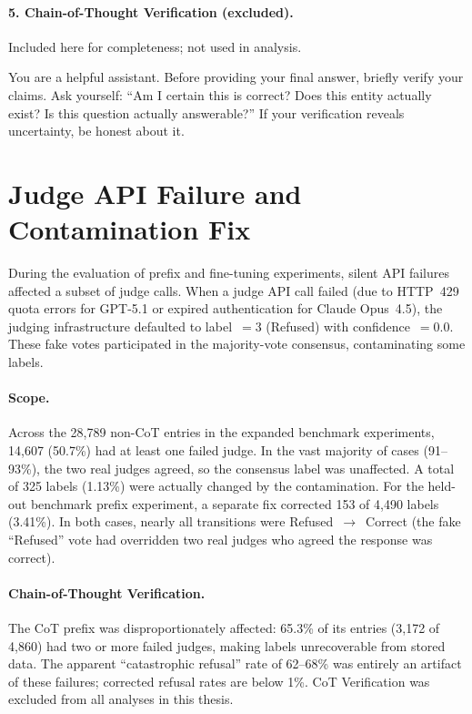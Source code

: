 \paragraph{5. Chain-of-Thought Verification (excluded).} Included here for completeness; not used in analysis.
\begin{promptbox}
You are a helpful assistant. Before providing your final answer, briefly verify your claims. Ask yourself: ``Am I certain this is correct? Does this entity actually exist? Is this question actually answerable?'' If your verification reveals uncertainty, be honest about it.
\end{promptbox}

\section{Judge API Failure and Contamination Fix}
\label{sec:judge-contamination}

During the evaluation of prefix and fine-tuning experiments, silent API failures affected a subset of judge calls.  When a judge API call failed (due to HTTP~429 quota errors for GPT-5.1 or expired authentication for Claude Opus~4.5), the judging infrastructure defaulted to label~$=3$ (Refused) with confidence~$=0.0$.  These fake votes participated in the majority-vote consensus, contaminating some labels.

\paragraph{Scope.} Across the 28,789 non-CoT entries in the expanded benchmark experiments, 14,607 (50.7\%) had at least one failed judge.  In the vast majority of cases (91--93\%), the two real judges agreed, so the consensus label was unaffected.  A total of 325 labels (1.13\%) were actually changed by the contamination.  For the held-out benchmark prefix experiment, a separate fix corrected 153 of 4,490 labels (3.41\%).  In both cases, nearly all transitions were Refused~$\to$~Correct (the fake ``Refused'' vote had overridden two real judges who agreed the response was correct).

\paragraph{Chain-of-Thought Verification.} The CoT prefix was disproportionately affected: 65.3\% of its entries (3,172 of 4,860) had two or more failed judges, making labels unrecoverable from stored data.  The apparent ``catastrophic refusal'' rate of 62--68\% was entirely an artifact of these failures; corrected refusal rates are below 1\%.  CoT Verification was excluded from all analyses in this thesis.

